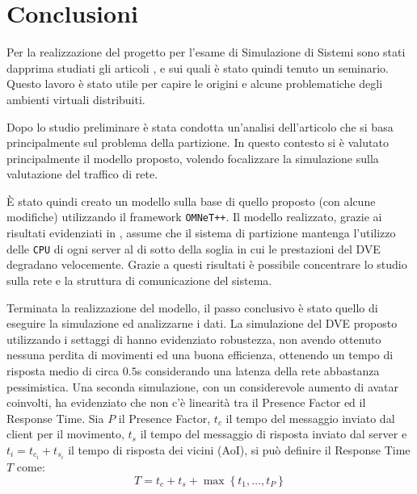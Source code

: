 \documentclass[a4paper, 11pt, oneside]{book}
\theoremstyle{definition}
\theoremstyle{remark}
\begin{document}
\chapter{Conclusioni}\label{conclusioni}
Per la realizzazione del progetto per l'esame di Simulazione di Sistemi
sono stati dapprima studiati gli articoli \cite{van}, \cite{zyda} e \cite{ghosh}
sui quali è stato quindi tenuto un seminario. Questo lavoro è stato utile per
capire le origini e alcune problematiche degli ambienti virtuali distribuiti.

Dopo lo studio preliminare è stata condotta un'analisi dell'articolo
\cite{IDVE} che si basa principalmente sul problema della partizione. In questo
contesto si è valutato principalmente il modello proposto, volendo focalizzare
la simulazione sulla valutazione del traffico di rete.

\`E stato quindi creato un modello sulla base di quello proposto (con alcune
modifiche) utilizzando il framework \texttt{OMNeT++}. Il modello realizzato,
grazie ai risultati evidenziati in \cite{IDVE}, assume che il sistema di
partizione mantenga l'utilizzo delle \texttt{CPU} di ogni server al di sotto
della soglia in cui le prestazioni del DVE degradano velocemente.
Grazie a questi risultati è possibile concentrare lo studio sulla rete e la
struttura di comunicazione del sistema.

Terminata la realizzazione del modello, il passo conclusivo è stato quello di
eseguire la simulazione ed analizzarne i dati. La simulazione del DVE proposto
utilizzando i settaggi di \cite{IDVE} hanno evidenziato robustezza, non avendo
ottenuto nessuna perdita di movimenti ed una buona efficienza, ottenendo un
tempo di risposta medio di circa $0.5$s considerando una latenza della rete
abbastanza pessimistica. Una seconda simulazione, con un considerevole aumento
di avatar coinvolti, ha evidenziato che non c'è linearità tra il Presence
Factor ed il Response Time. Sia $P$ il Presence Factor, $t_c$ il tempo
del messaggio inviato dal client per il movimento, $t_s$ il tempo del messaggio
di risposta inviato dal server e $t_i = t_{c_i} + t_{s_i}$ il tempo di risposta
dei vicini (AoI), si può definire il Response Time $T$ come:
\[
T = t_c + t_s + \max\left\{t_1, \ldots, t_{P}\right\}
\]

\appendix
\end{document}
